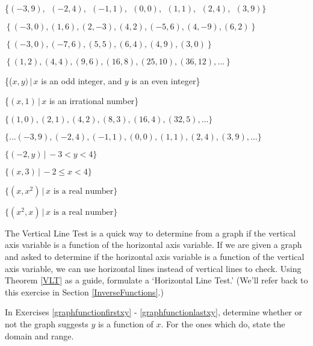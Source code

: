 \begin{exenum}
\item \{$(-3, 9)$, $\;(-2, 4)$, $\;(-1, 1)$, $\;(0, 0)$, $\;(1, 1)$, $\;(2, 4)$, $\;(3, 9)\}$ \label{setfunctionfirst}
\item  $\left\{ (-3,0), (1,6), (2, -3), (4,2), (-5,6), (4, -9), (6,2) \right\}$
\item  $\left\{ (-3,0), (-7,6), (5,5), (6,4), (4,9), (3,0) \right\}$
\item  $\left\{ (1,2), (4,4), (9,6), (16,8), (25,10), (36, 12), \ldots \right\}$
\item \{($x, y) \, | \, x$ is an odd integer, and $y$ is an even integer\}
\item \{$(x, 1) \, | \, x$ is an irrational number\}
\item $\{ (1,0), (2,1), (4,2), (8,3), (16,4), (32, 5), \ldots \}$
\item $\{ \ldots (-3,9), (-2,4), (-1,1), (0,0), (1,1), (2,4), (3,9), \ldots \}$
\item $\{ (-2, y) \, | \, -3 < y < 4\}$
\item  $\{ (x,3) \, | \,  -2 \leq x < 4\}$
\item  $\{ \left(x,x^2\right) \, | \, \text{$x$ is a real number} \}$
\item  $\{ \left(x^2,x\right) \, | \, \text{$x$ is a real number} \}$ \label{setfunctionlast}
\item  \label{HLTExercise} The Vertical Line Test is a quick way to determine from a graph if the vertical axis variable is a function of the horizontal axis variable. If we are given a graph and asked to determine if the horizontal axis variable is a function of the vertical axis variable, we can use horizontal lines instead of vertical lines to check.  Using Theorem \ref{VLT} as a guide,  formulate a `Horizontal Line Test.'  (We'll refer back to this exercise in Section \ref{InverseFunctions}.)
\end{exenum}

In Exercises \ref{graphfunctionfirstxy} - \ref{graphfunctionlastxy}, determine whether or not the graph suggests $y$ is a function of $x$.  For the ones which do, state the domain and range. 

